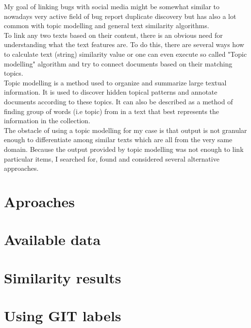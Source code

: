 My goal of linking bugs with social media might be somewhat similar to nowadays very active field of bug report duplicate discovery but has also a lot common with topic modelling and general text similarity algorithms.\\
To link any two texts based on their content, there is an obvious need for understanding what the text features are. 
To do this, there are several ways how to calculate text (string) similarity value or one can even execute so called "Topic modelling" algorithm and try to connect documents based on their matching topics.\\
Topic modelling is a method used to organize and summarize large textual information. It is used to discover hidden topical patterns and annotate documents according to these topics. It can also be described as a method of finding group of words (i.e topic) from in a text that best represents the information in the collection.\\
The obstacle of using a topic modelling for my case is that output is not granular enough to differentiate among similar texts which are all from the very same domain. Because the output provided by topic modelling was not enough to link particular items, I searched for, found and considered several alternative approaches.

\section{Aproaches}
\label{sec:pairingApproaches}


\section{Available data}


\section{Similarity results}


\section{Using GIT labels}

